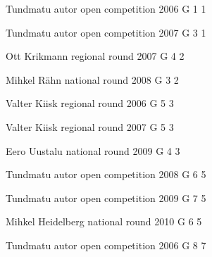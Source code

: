 \documentclass[11pt]{article}
\begin{document}
\ylDisplay{} %
{Tundmatu autor} %
{open competition} %
{2006} %
{G 1} %
{1} %
{

\ifEngSolution
\fi
}

\ylDisplay{} %
{Tundmatu autor} %
{open competition} %
{2007} %
{G 3} %
{1} %
{

\ifEngSolution
\fi
}

\ylDisplay{} %
{Ott Krikmann} %
{regional round} %
{2007} %
{G 4} %
{2} %
{

\ifEngSolution
\fi
}

\ylDisplay{} %
{Mihkel Rähn} %
{national round} %
{2008} %
{G 3} %
{2} %
{

\ifEngSolution
\fi
}

\ylDisplay{} %
{Valter Kiisk} %
{regional round} %
{2006} %
{G 5} %
{3} %
{

\ifEngSolution
\fi
}

\ylDisplay{} %
{Valter Kiisk} %
{regional round} %
{2007} %
{G 5} %
{3} %
{

\ifEngSolution
\fi
}

\ylDisplay{} %
{Eero Uustalu} %
{national round} %
{2009} %
{G 4} %
{3} %
{

\ifEngSolution
\fi
}

\ylDisplay{} %
{Tundmatu autor} %
{open competition} %
{2008} %
{G 6} %
{5} %
{

\ifEngSolution
\fi
}

\ylDisplay{} %
{Tundmatu autor} %
{open competition} %
{2009} %
{G 7} %
{5} %
{

\ifEngSolution
\fi
}

\ylDisplay{} %
{Mihkel Heidelberg} %
{national round} %
{2010} %
{G 6} %
{5} %
{

\ifEngSolution
\fi
}

\ylDisplay{} %
{Tundmatu autor} %
{open competition} %
{2006} %
{G 8} %
{7} %
{

\ifEngSolution
\fi
}
\end{document}
